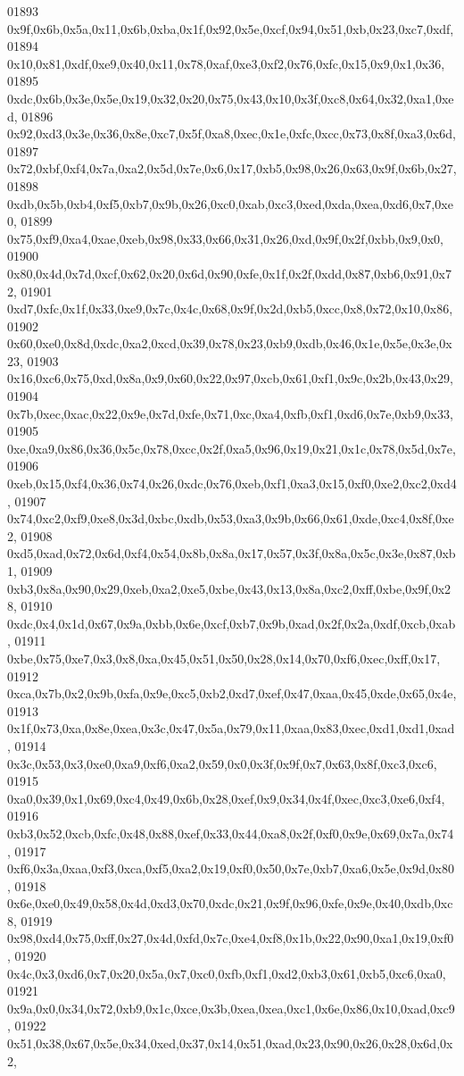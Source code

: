 \begin{DoxyCode}
01893   0x9f,0x6b,0x5a,0x11,0x6b,0xba,0x1f,0x92,0x5e,0xcf,0x94,0x51,0xb,0x23,0xc7,0xdf,
01894   0x10,0x81,0xdf,0xe9,0x40,0x11,0x78,0xaf,0xe3,0xf2,0x76,0xfc,0x15,0x9,0x1,0x36,
01895   0xdc,0x6b,0x3e,0x5e,0x19,0x32,0x20,0x75,0x43,0x10,0x3f,0xc8,0x64,0x32,0xa1,0xed,
01896   0x92,0xd3,0x3e,0x36,0x8e,0xc7,0x5f,0xa8,0xec,0x1e,0xfc,0xcc,0x73,0x8f,0xa3,0x6d,
01897   0x72,0xbf,0xf4,0x7a,0xa2,0x5d,0x7e,0x6,0x17,0xb5,0x98,0x26,0x63,0x9f,0x6b,0x27,
01898   0xdb,0x5b,0xb4,0xf5,0xb7,0x9b,0x26,0xc0,0xab,0xc3,0xed,0xda,0xea,0xd6,0x7,0xe0,
01899   0x75,0xf9,0xa4,0xae,0xeb,0x98,0x33,0x66,0x31,0x26,0xd,0x9f,0x2f,0xbb,0x9,0x0,
01900   0x80,0x4d,0x7d,0xcf,0x62,0x20,0x6d,0x90,0xfe,0x1f,0x2f,0xdd,0x87,0xb6,0x91,0x72,
01901   0xd7,0xfc,0x1f,0x33,0xe9,0x7c,0x4c,0x68,0x9f,0x2d,0xb5,0xcc,0x8,0x72,0x10,0x86,
01902   0x60,0xe0,0x8d,0xdc,0xa2,0xcd,0x39,0x78,0x23,0xb9,0xdb,0x46,0x1e,0x5e,0x3e,0x23,
01903   0x16,0xc6,0x75,0xd,0x8a,0x9,0x60,0x22,0x97,0xcb,0x61,0xf1,0x9c,0x2b,0x43,0x29,
01904   0x7b,0xec,0xac,0x22,0x9e,0x7d,0xfe,0x71,0xc,0xa4,0xfb,0xf1,0xd6,0x7e,0xb9,0x33,
01905   0xe,0xa9,0x86,0x36,0x5c,0x78,0xcc,0x2f,0xa5,0x96,0x19,0x21,0x1c,0x78,0x5d,0x7e,
01906   0xeb,0x15,0xf4,0x36,0x74,0x26,0xdc,0x76,0xeb,0xf1,0xa3,0x15,0xf0,0xe2,0xc2,0xd4,
01907   0x74,0xc2,0xf9,0xe8,0x3d,0xbc,0xdb,0x53,0xa3,0x9b,0x66,0x61,0xde,0xc4,0x8f,0xe2,
01908   0xd5,0xad,0x72,0x6d,0xf4,0x54,0x8b,0x8a,0x17,0x57,0x3f,0x8a,0x5c,0x3e,0x87,0xb1,
01909   0xb3,0x8a,0x90,0x29,0xeb,0xa2,0xe5,0xbe,0x43,0x13,0x8a,0xc2,0xff,0xbe,0x9f,0x28,
01910   0xdc,0x4,0x1d,0x67,0x9a,0xbb,0x6e,0xcf,0xb7,0x9b,0xad,0x2f,0x2a,0xdf,0xcb,0xab,
01911   0xbe,0x75,0xe7,0x3,0x8,0xa,0x45,0x51,0x50,0x28,0x14,0x70,0xf6,0xec,0xff,0x17,
01912   0xca,0x7b,0x2,0x9b,0xfa,0x9e,0xc5,0xb2,0xd7,0xef,0x47,0xaa,0x45,0xde,0x65,0x4e,
01913   0x1f,0x73,0xa,0x8e,0xea,0x3c,0x47,0x5a,0x79,0x11,0xaa,0x83,0xec,0xd1,0xd1,0xad,
01914   0x3c,0x53,0x3,0xe0,0xa9,0xf6,0xa2,0x59,0x0,0x3f,0x9f,0x7,0x63,0x8f,0xc3,0xc6,
01915   0xa0,0x39,0x1,0x69,0xc4,0x49,0x6b,0x28,0xef,0x9,0x34,0x4f,0xec,0xc3,0xe6,0xf4,
01916   0xb3,0x52,0xcb,0xfc,0x48,0x88,0xef,0x33,0x44,0xa8,0x2f,0xf0,0x9e,0x69,0x7a,0x74,
01917   0xf6,0x3a,0xaa,0xf3,0xca,0xf5,0xa2,0x19,0xf0,0x50,0x7e,0xb7,0xa6,0x5e,0x9d,0x80,
01918   0x6e,0xe0,0x49,0x58,0x4d,0xd3,0x70,0xdc,0x21,0x9f,0x96,0xfe,0x9e,0x40,0xdb,0xc8,
01919   0x98,0xd4,0x75,0xff,0x27,0x4d,0xfd,0x7c,0xe4,0xf8,0x1b,0x22,0x90,0xa1,0x19,0xf0,
01920   0x4c,0x3,0xd6,0x7,0x20,0x5a,0x7,0xc0,0xfb,0xf1,0xd2,0xb3,0x61,0xb5,0xc6,0xa0,
01921   0x9a,0x0,0x34,0x72,0xb9,0x1c,0xce,0x3b,0xea,0xea,0xc1,0x6e,0x86,0x10,0xad,0xc9,
01922   0x51,0x38,0x67,0x5e,0x34,0xed,0x37,0x14,0x51,0xad,0x23,0x90,0x26,0x28,0x6d,0x2,

\end{DoxyCode}
